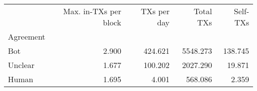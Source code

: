 \begin{tabular}{lrrrr}
\toprule
{} &  Max. in-TXs per block &  TXs per day &  Total TXs &  Self-TXs \\
Agreement &                        &              &            &           \\
\midrule
Bot       &                  2.900 &      424.621 &   5548.273 &   138.745 \\
Unclear   &                  1.677 &      100.202 &   2027.290 &    19.871 \\
Human     &                  1.695 &        4.001 &    568.086 &     2.359 \\
\bottomrule
\end{tabular}
